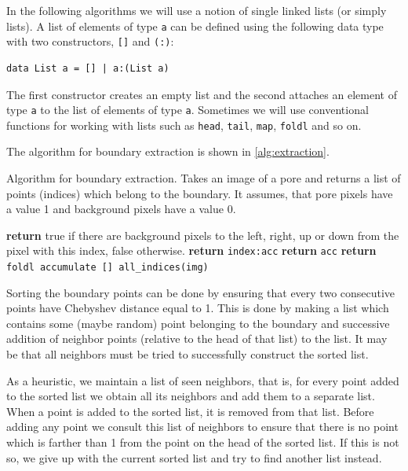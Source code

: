 \documentclass[reprint,amsmath,amssymb,aps,pre,showkeys,showpacs]{revtex4-1}
\begin{document}
In the following algorithms we will use a notion of single linked lists (or
simply lists). A list of elements of type \texttt{a} can be defined using the
following data type with two constructors, \texttt{[]} and \texttt{(:)}:
\begin{verbatim}
data List a = [] | a:(List a)
\end{verbatim}
The first constructor creates an empty list and the second attaches an element
of type \texttt{a} to the list of elements of type \texttt{a}. Sometimes we will
use conventional functions for working with lists such as \texttt{head},
\texttt{tail}, \texttt{map}, \texttt{foldl} and so on.

The algorithm for boundary extraction is shown in \cref{alg:extraction}.
\begin{algorithm}[H]
  \caption{Algorithm for boundary extraction. Takes an image of a pore and
    returns a list of points (indices) which belong to the boundary. It assumes,
  that pore pixels have a value 1 and background pixels have a value 0.}
  \label{alg:extraction}
  \begin{algorithmic}[1]
    \State \textbf{return} true if there are background pixels to the left,
    right, up or down from the pixel with this index, false otherwise.
    \EndProcedure
    \State \textbf{return} \texttt{index:acc}
    \Else
    \State \textbf{return} \texttt{acc}
    \EndIf
    \EndProcedure
    \State \textbf{return} \texttt{foldl accumulate [] all\_indices(img)}
    \EndProcedure
  \end{algorithmic}
\end{algorithm}

Sorting the boundary points can be done by ensuring that every two consecutive
points have Chebyshev distance equal to 1. This is done by making a list which
contains some (maybe random) point belonging to the boundary and successive
addition of neighbor points (relative to the head of that list) to the list. It
may be that all neighbors must be tried to successfully construct the sorted
list.

As a heuristic, we maintain a list of seen neighbors, that is, for every point
added to the sorted list we obtain all its neighbors and add them to a separate
list. When a point is added to the sorted list, it is removed from that
list. Before adding any point we consult this list of neighbors to ensure that
there is no point which is farther than 1 from the point on the head of the
sorted list. If this is not so, we give up with the current sorted list and try
to find another list instead.
\end{document}

